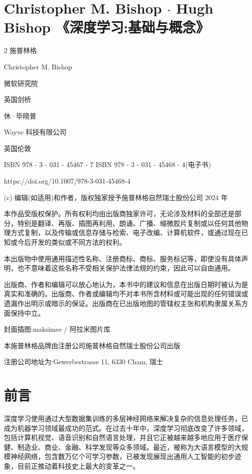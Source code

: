 \documentclass[10pt]{article}
\newcommand{\customfootnote}[1]{
  \let\thefootnote\relax\footnotetext{#1}
}
\begin{document}
\customfootnote{

深度学习

}

\section*{Christopher M. Bishop \(\cdot\) Hugh Bishop 《深度学习:基础与概念》}

2 施普林格

Christopher M. Bishop

微软研究院

英国剑桥

休·毕晓普

Wayve 科技有限公司

英国伦敦

ISBN 978 - 3 - 031 - 45467 - 7 ISBN 978 - 3 - 031 - 45468 - 4(电子书)

https://doi.org/10.1007/978-3-031-45468-4

(c) 编辑(如适用)和作者，版权独家授予施普林格自然瑞士股份公司 2024 年

本作品受版权保护。所有权利均由出版商独家许可，无论涉及材料的全部还是部分，特别是翻译、再版、插图再利用、朗诵、广播、缩微胶片复制或以任何其他物理方式复制，以及传输或信息存储与检索、电子改编、计算机软件，或通过现在已知或今后开发的类似或不同方法的权利。

本出版物中使用通用描述性名称、注册商标、商标、服务标记等，即使没有具体声明，也不意味着这些名称不受相关保护法律法规的约束，因此可以自由通用。

出版商、作者和编辑可以放心地认为，本书中的建议和信息在出版日期时被认为是真实和准确的。出版商、作者或编辑均不对本书所含材料或可能出现的任何错误或遗漏作出明示或暗示的保证。出版商在已出版地图的管辖权主张和机构隶属关系方面保持中立。

封面插图:maksimee / 阿拉米图片库

本施普林格品牌由注册公司施普林格自然瑞士股份公司出版

注册公司地址为:Gewerbestrasse 11, 6330 Cham, 瑞士

\section*{前言}

深度学习使用通过大型数据集训练的多层神经网络来解决复杂的信息处理任务，已成为机器学习领域最成功的范式。在过去十年中，深度学习彻底改变了许多领域，包括计算机视觉、语音识别和自然语言处理，并且它正被越来越多地应用于医疗保健、制造业、商业、金融、科学发现等众多领域。最近，被称为大语言模型的大规模神经网络，包含数万亿个可学习参数，已被发现展现出通用人工智能的初步迹象，目前正推动着科技史上最大的变革之一。
\end{document}
